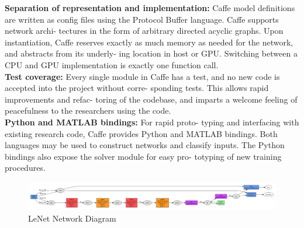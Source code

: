  \textbf{Separation of representation and implementation:} Caffe model definitions are written as config files using the Protocol Buffer language. Caffe supports network archi- tectures in the form of arbitrary directed acyclic graphs. Upon instantiation, Caffe reserves exactly as much memory as needed for the network, and abstracts from its underly- ing location in host or GPU. Switching between a CPU and GPU implementation is exactly one function call. \\

\textbf{Test coverage:} Every single module in Caffe has a test, and no new code is accepted into the project without corre- sponding tests. This allows rapid improvements and refac- toring of the codebase, and imparts a welcome feeling of peacefulness to the researchers using the code. \\

\textbf{Python and MATLAB bindings:} For rapid proto- typing and interfacing with existing research code, Caffe provides Python and MATLAB bindings. Both languages may be used to construct networks and classify inputs. The Python bindings also expose the solver module for easy pro- totyping of new training procedures.

\begin{figure}[t]
	\begin{center}
		\includegraphics[width=\textwidth]{Figures/Figure18}
	\end{center}
	\caption{LeNet Network Diagram\cite{lecun}}
	\label{fig:Figure18}
\end{figure}
